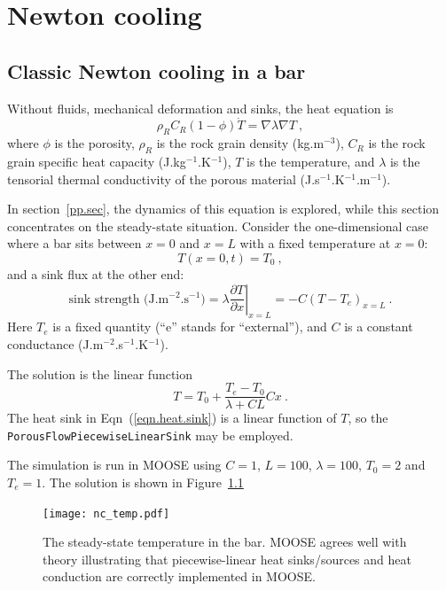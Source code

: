 \chapter{Newton cooling}
\section{Classic Newton cooling in a bar}

Without fluids, mechanical deformation and sinks, the heat equation is
\begin{equation}
\rho_{R}C_{R}(1-\phi)\dot{T} = \nabla\lambda\nabla T \ ,
\end{equation}
where $\phi$ is the porosity, $\rho_{R}$ is the rock grain density
(kg.m$^{-3}$), $C_{R}$ is the rock grain specific heat capacity
(J.kg$^{-1}$.K$^{-1}$), $T$ is the temperature, and $\lambda$ is the
tensorial thermal conductivity of the porous material
(J.s$^{-1}$.K$^{-1}$.m$^{-1}$).

In section~\ref{pp.sec}, the dynamics of this equation is explored,
while this section concentrates on the steady-state situation.
Consider the one-dimensional case where a bar sits between $x=0$ and
$x=L$ with a fixed temperature at $x=0$:
\begin{equation}
T(x=0, t) = T_{0} \ ,
\end{equation}
and a sink flux at the other end:
\begin{equation}
\mbox{sink strength (J.m$^{-2}$.s$^{-1}$)} = \left.\lambda\frac{\partial
  T}{\partial x}\right|_{x=L} = -C\left(T - T_{e}\right)_{x=L} \ .
\label{eqn.heat.sink}
\end{equation}
Here $T_{e}$ is a fixed quantity (``e'' stands for ``external''), and
$C$ is a constant conductance (J.m$^{-2}$.s$^{-1}$.K$^{-1}$).

The solution is the linear function
\begin{equation}
T = T_{0} + \frac{T_{e} - T_{0}}{\lambda + C L} C x \ .
\end{equation}
The heat sink in Eqn~(\ref{eqn.heat.sink}) is a linear function of
$T$, so the {\tt PorousFlowPiecewiseLinearSink} may be employed.

The simulation is run in MOOSE using $C=1$, $L=100$, $\lambda=100$,
$T_{0}=2$ and $T_{e}=1$.  The solution is shown in Figure~\ref{nc_heat.fig}

\begin{figure}[htb]
\begin{center}
\texttt{[image: nc\_temp.pdf]}
\caption{The steady-state temperature in the bar.  MOOSE agrees well
  with theory illustrating that piecewise-linear heat sinks/sources
  and heat conduction are correctly implemented in MOOSE.}
\label{nc_heat.fig}
\end{center}
\end{figure}


